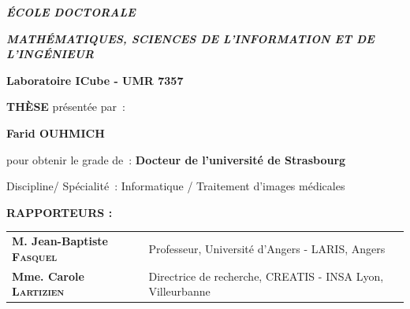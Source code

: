 \begin{titlingpage}
\vspace{1cm}

{
\centering


{\fontsize{14}{0}\selectfont \textbf{ \uppercase{\textit{\'{E}COLE DOCTORALE}}}}

\vspace{0.3cm}


{\fontsize{14}{0}\selectfont \textbf{ \uppercase{\textit{Math\'{e}matiques, Sciences de l'Information et de l'Ing\'{e}nieur}}}}

\vspace{0.5cm}

{\fontsize{16}{0}\selectfont \textbf{ Laboratoire ICube - UMR 7357}}

\vspace{1cm}

{\fontsize{22}{0}\selectfont \textbf{ \uppercase{\textsc{Th\`ese}}}} \hspace{0.2cm} {\fontsize{12}{0}\selectfont pr\'esent\'ee par~:}

\vspace{0.5cm}

{\fontsize{18}{0}\selectfont \textbf{ Farid OUHMICH}}


\vspace{2cm}


{\fontsize{13}{0}\selectfont pour obtenir le grade de~: \textbf{Docteur de l'universit\'e de
Strasbourg}}

\vspace{0.4cm}

{\fontsize{12}{0}\selectfont Discipline/ Sp\'ecialit\'e~: Informatique / Traitement d'images m\'edicales}


\vspace{2cm}

{\setlength{\fboxrule}{1pt}
\fbox{\parbox[c][3.5cm]{16cm}{
\centering\fontsize{23}{0}\selectfont \textbf{{\thetitle}}}}}

\vspace{3cm}
}

{
\fontsize{12}{2}\selectfont 


\textbf{RAPPORTEURS :}\\

\hspace*{0.5cm}
\begin{tabular}{p{6cm}l}
	\textbf{M. Jean-Baptiste \textsc{Fasquel}} & Professeur, Universit\'e d'Angers - LARIS, Angers \\
	\textbf{Mme. Carole \textsc{Lartizien}} & Directrice de recherche,  CREATIS - INSA Lyon, Villeurbanne
\end{tabular}


}
\end{titlingpage}
